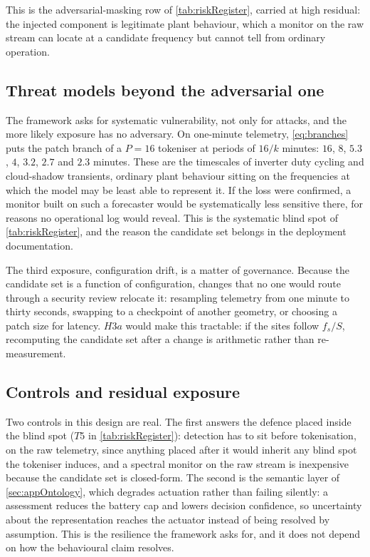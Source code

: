 

This is the adversarial-masking row of \autoref{tab:riskRegister}, carried at high residual: the injected component is legitimate plant behaviour, which a monitor on the raw stream can locate at a candidate frequency but cannot tell from ordinary operation.

\subsection{Threat models beyond the adversarial one}

The framework asks for systematic vulnerability, not only for attacks, and the more likely exposure has no adversary. On one-minute telemetry, \autoref{eq:branches} puts the patch branch of a $P{=}16$ tokeniser at periods of $16/k$ minutes: $16$, $8$, $5.3$, $4$, $3.2$, $2.7$ and $2.3$ minutes. These are the timescales of inverter duty cycling and cloud-shadow transients, ordinary plant behaviour sitting on the frequencies at which the model may be least able to represent it. If the loss were confirmed, a monitor built on such a forecaster would be systematically less sensitive there, for reasons no operational log would reveal. This is the systematic blind spot of \autoref{tab:riskRegister}, and the reason the candidate set belongs in the deployment documentation.

The third exposure, configuration drift, is a matter of governance. Because the candidate set is a function of configuration, changes that no one would route through a security review relocate it: resampling telemetry from one minute to thirty seconds, swapping to a checkpoint of another geometry, or choosing a patch size for latency. $H3a$ would make this tractable: if the sites follow $f_s/S$, recomputing the candidate set after a change is arithmetic rather than re-measurement.

\subsection{Controls and residual exposure}

Two controls in this design are real. The first answers the defence placed inside the blind spot ($T5$ in \autoref{tab:riskRegister}): detection has to sit before tokenisation, on the raw telemetry, since anything placed after it would inherit any blind spot the tokeniser induces, and a spectral monitor on the raw stream is inexpensive because the candidate set is closed-form. The second is the semantic layer of \autoref{sec:appOntology}, which degrades actuation rather than failing silently: a  assessment reduces the battery cap and lowers decision confidence, so uncertainty about the representation reaches the actuator instead of being resolved by assumption. This is the resilience the framework asks for, and it does not depend on how the behavioural claim resolves.


